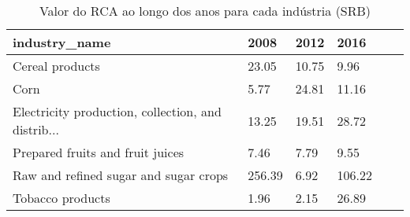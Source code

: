 \begin{table}
\centering
\caption{Valor do RCA ao longo dos anos para cada indústria (SRB)}
\begin{tabular}{p{6cm}p{1.5cm}p{1.5cm}p{1.5cm}p{1.5cm}p{1.5cm}}
\toprule
                                     industry\_name &   2008 &  2012 &   2016 \\
\midrule
                                   Cereal products &  23.05 & 10.75 &   9.96 \\
                                              Corn &   5.77 & 24.81 &  11.16 \\
Electricity production, collection, and distrib... &  13.25 & 19.51 &  28.72 \\
                  Prepared fruits and fruit juices &   7.46 &  7.79 &   9.55 \\
             Raw and refined sugar and sugar crops & 256.39 &  6.92 & 106.22 \\
                                  Tobacco products &   1.96 &  2.15 &  26.89 \\
\bottomrule
\end{tabular}
\end{table}
